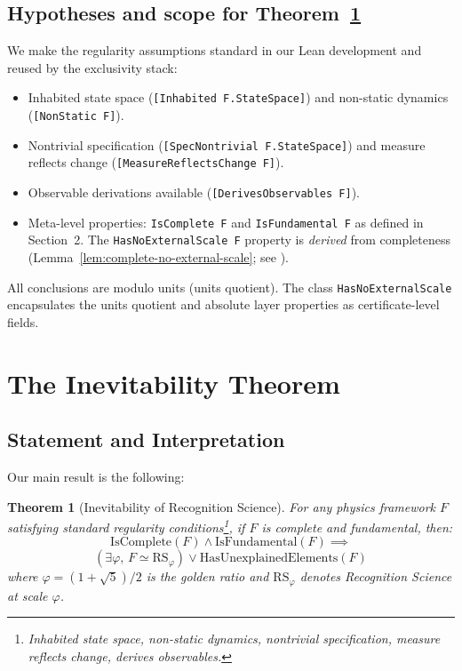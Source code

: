 \documentclass[12pt]{article}
\newtheorem{theorem}{Theorem}[section]
\theoremstyle{remark}
\begin{document}
\subsection*{Hypotheses and scope for Theorem~\ref{thm:inevitability}}
We make the regularity assumptions standard in our Lean development and reused by the exclusivity stack:
\begin{itemize}
  \item Inhabited state space (\texttt{[Inhabited F.StateSpace]}) and non-static dynamics (\texttt{[NonStatic F]}).
  \item Nontrivial specification (\texttt{[SpecNontrivial F.StateSpace]}) and measure reflects change (\texttt{[MeasureReflectsChange F]}).
  \item Observable derivations available (\texttt{[DerivesObservables F]}).
  \item Meta-level properties: \texttt{IsComplete F} and \texttt{IsFundamental F} as defined in Section~2. The \texttt{HasNoExternalScale F} property is \emph{derived} from completeness (Lemma~\ref{lem:complete-no-external-scale}; see ).
\end{itemize}
All conclusions are modulo units (units quotient). The class \texttt{HasNoExternalScale} encapsulates the units quotient and absolute layer properties as certificate-level fields.

\section{The Inevitability Theorem}

\subsection{Statement and Interpretation}

Our main result is the following:

\begin{theorem}[Inevitability of Recognition Science]\label{thm:inevitability}
For any physics framework $F$ satisfying standard regularity conditions\footnote{Inhabited state space, non-static dynamics, nontrivial specification, measure reflects change, derives observables.}, if $F$ is complete and fundamental, then:
\[
\mathrm{IsComplete}(F) \land \mathrm{IsFundamental}(F) \implies
\]
\[
\left(\exists \varphi,\, F \simeq \mathrm{RS}_\varphi\right) \lor \mathrm{HasUnexplainedElements}(F)
\]
where $\varphi = (1+\sqrt{5})/2$ is the golden ratio and $\mathrm{RS}_\varphi$ denotes Recognition Science at scale $\varphi$.
\end{theorem}
\end{document}
